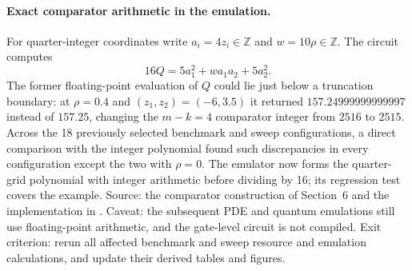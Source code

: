 \documentclass[11pt,a4paper]{article}
\begin{document}
\paragraph{Exact comparator arithmetic in the emulation.}
For quarter-integer coordinates write $a_i=4z_i\in\mathbb Z$ and
$w=10\rho\in\mathbb Z$. The circuit computes
\[
 16Q=5a_1^2+w a_1a_2+5a_2^2.
\]
The former floating-point evaluation of $Q$ could lie just below a truncation
boundary: at $\rho=0.4$ and $(z_1,z_2)=(-6,3.5)$ it returned
$157.24999999999997$ instead of $157.25$, changing the $m-k=4$ comparator
integer from $2516$ to $2515$. Across the 18 previously selected benchmark
and sweep configurations, a direct comparison with the integer polynomial
found such discrepancies in every configuration except the two with
$\rho=0$. The emulator now forms the quarter-grid polynomial with integer
arithmetic before dividing by 16; its regression test covers the example.
Source: the comparator construction of Section~6 and the implementation in
. Caveat: the subsequent PDE and quantum
emulations still use floating-point arithmetic, and the gate-level circuit is
not compiled. Exit criterion: rerun all affected benchmark and sweep resource
and emulation calculations, and update their derived tables and figures.
\end{document}
